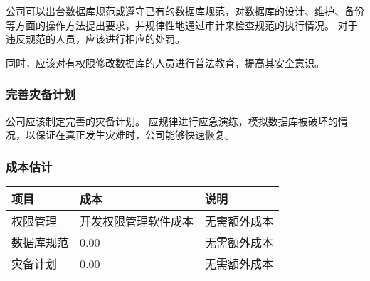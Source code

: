 \documentclass[a4paper,12pt]{ctexart}
\begin{document}
公司可以出台数据库规范或遵守已有的数据库规范，对数据库的设计、维护、备份等方面的操作方法提出要求，并规律性地通过审计来检查规范的执行情况。
对于违反规范的人员，应该进行相应的处罚。

同时，应该对有权限修改数据库的人员进行普法教育，提高其安全意识。

\subsubsection*{完善灾备计划}

公司应该制定完善的灾备计划。
应规律进行应急演练，模拟数据库被破坏的情况，以保证在真正发生灾难时，公司能够快速恢复。

\subsubsection*{成本估计}

\begin{center}
	\begin{tabular}{lll}
		\toprule
		\textbf{项目} & \textbf{成本} & \textbf{说明} \\ \midrule
		权限管理 & 开发权限管理软件成本 & 无需额外成本 \\
		数据库规范 & 0.00\textyen & 无需额外成本 \\
		灾备计划 & 0.00\textyen & 无需额外成本 \\
		\bottomrule
	\end{tabular}
\end{center}
\end{document}
